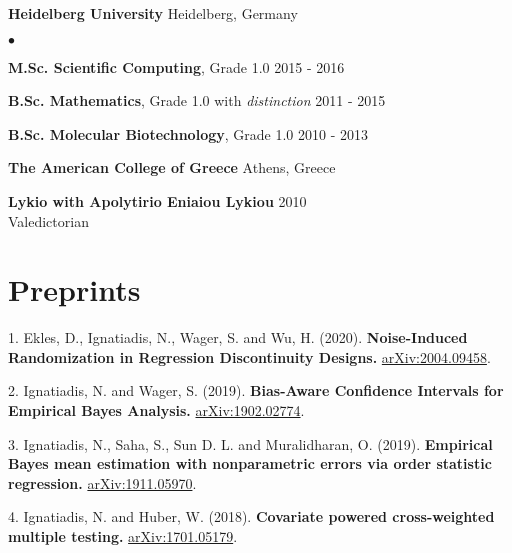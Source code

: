 \documentclass[margin,line]{res}
\newcommand{\g}{\textgreek}
\newenvironment{list1}{
  \begin{list}{\ding{113}}{%
      \setlength{\itemsep}{0in}
      \setlength{\parsep}{0in} \setlength{\parskip}{0in}
      \setlength{\topsep}{0in} \setlength{\partopsep}{0in}
      \setlength{\leftmargin}{0.17in}}}{\end{list}}
\newenvironment{list2}{
  \begin{list}{$\bullet$}{%
      \setlength{\itemsep}{0in}
      \setlength{\parsep}{0in} \setlength{\parskip}{0in}
      \setlength{\topsep}{0in} \setlength{\partopsep}{0in}
      \setlength{\leftmargin}{0.2in}}}{\end{list}}
\begin{document}
\begin{resume}
\vspace*{-2.5mm}
{\bf {Heidelberg University}} \hfill  {Heidelberg, Germany}\\
\vspace*{-.14in}
\begin{list2}
\item \textbf{M.Sc. Scientific Computing}, Grade 1.0 \hfill 2015 - 2016
\item \textbf{B.Sc. Mathematics}, Grade 1.0 with \emph{distinction} \hfill 2011 - 2015
\item \textbf{B.Sc. Molecular Biotechnology}, Grade 1.0 \hfill 2010 - 2013
\end{list2}

\vspace*{-2.5mm}
{\bf {{The American College of Greece}}} \hfill  {Athens, Greece}\\
\vspace*{-.14in}
\begin{list1}
\item[]
\textbf{Lykio with Apolytirio Eniaiou Lykiou}  \hfill 2010\\
Valedictorian
\end{list1}


\section{\sc Preprints}
\begin{list1}
\item[1.] Ekles, D., Ignatiadis, N., Wager, S. and Wu, H.  (2020). \textbf{Noise-Induced Randomization in Regression Discontinuity Designs.} \href{https://arxiv.org/abs/2004.09458}{arXiv:2004.09458}.
\item[2.] Ignatiadis, N. and Wager, S. (2019). \textbf{Bias-Aware Confidence Intervals for Empirical Bayes Analysis.} \href{https://arxiv.org/abs/1902.02774}{arXiv:1902.02774}.
\item[3.] Ignatiadis, N., Saha, S., Sun D. L. and Muralidharan, O. (2019). \textbf{Empirical Bayes mean estimation with nonparametric errors via order statistic regression.} \href{https://arxiv.org/abs/1911.05970}{arXiv:1911.05970}.
\item[4.] Ignatiadis, N. and Huber, W. (2018). \textbf{Covariate powered cross-weighted multiple testing.} \href{https://arxiv.org/abs/1701.05179}{arXiv:1701.05179}.
\end{list1}



\end{resume}
\end{document}
